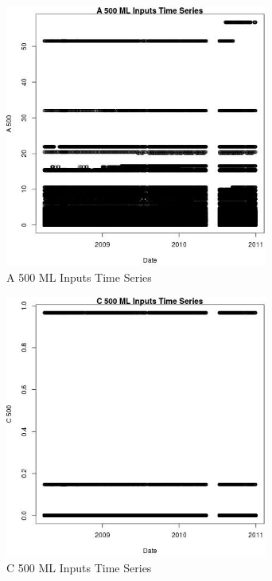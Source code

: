 \begin{figure} 
\centering  
\includegraphics[width=0.77\textwidth]{Code_Outputs/ML_input_report_ML_input_PM25_Step5_part_d_de_duplicated_aves_ML_input_A_500vDate.jpg} 
\caption{\label{fig:ML_input_report_ML_input_PM25_Step5_part_d_de_duplicated_aves_ML_inputA_500vDate}A 500 ML Inputs Time Series} 
\end{figure} 
 

\begin{figure} 
\centering  
\includegraphics[width=0.77\textwidth]{Code_Outputs/ML_input_report_ML_input_PM25_Step5_part_d_de_duplicated_aves_ML_input_C_500vDate.jpg} 
\caption{\label{fig:ML_input_report_ML_input_PM25_Step5_part_d_de_duplicated_aves_ML_inputC_500vDate}C 500 ML Inputs Time Series} 
\end{figure} 
 


